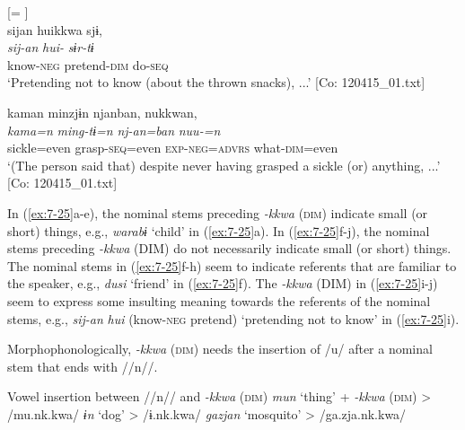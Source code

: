 \ex \label{ex:7:25i}  [= ]\\

{\TM}
\glll  sijan  huikkwa  sjɨ,\\
\textit{sij-an}  \textit{hui-}  \textit{sɨr-tɨ}\\
know-\textsc{neg}  pretend-\textsc{dim}  do-\textsc{seq}\\
\glt ‘Pretending not to know (about the thrown snacks), ...’ [Co: 120415\_01.txt]

\ex \label{ex:7:25j}
 {\TM}
\glll  kaman  minzjɨn  njanban,  nukkwan,\footnotemark\\
\textit{kama=n}  \textit{ming-tɨ=n}  \textit{nj-an=ban}  \textit{nuu-=n}\\
sickle=even  grasp-\textsc{seq}=even  \textsc{exp}-\textsc{neg}=\textsc{advrs}  what-\textsc{dim}=even\\
\glt ‘(The person said that) despite never having grasped a sickle (or) anything, ...’ [Co: 120415\_01.txt]

\z
\z

In (\ref{ex:7-25}a-e), the nominal stems preceding \textit{{}-kkwa} (\textsc{dim}) indicate small (or short) things, e.g., \textit{warabɨ} ‘child’ in (\ref{ex:7-25}a). In (\ref{ex:7-25}f-j), the nominal stems preceding \textit{{}-kkwa} (DIM) do not necessarily indicate small (or short) things. The nominal stems in (\ref{ex:7-25}f-h) seem to indicate referents that are familiar to the speaker, e.g., \textit{dusi} ‘friend’ in (\ref{ex:7-25}f). The \textit{{}-kkwa} (DIM) in (\ref{ex:7-25}i-j) seem to express some insulting meaning towards the referents of the nominal stems, e.g., \textit{sij-an} \textit{hui} (know-\textsc{neg} pretend) ‘pretending not to know’ in (\ref{ex:7-25}i).

  Morphophonologically, \textit{{}-kkwa} (\textsc{dim}) needs the insertion of /u/ after a nominal stem that ends with //n//.

\ea \label{ex:7:26}  Vowel insertion between //n// and \textit{{}-kkwa} (\textsc{dim})
  \ea  \textit{mun}  ‘thing’  +  \textit{{}-kkwa} (\textsc{dim})  >  /mu.nk.kwa/
  \ex  \textit{ɨn}  ‘dog’      >  /ɨ.nk.kwa/
  \ex  \textit{gazjan}  ‘mosquito’      >  /ga.zja.nk.kwa/
    \z
\z

